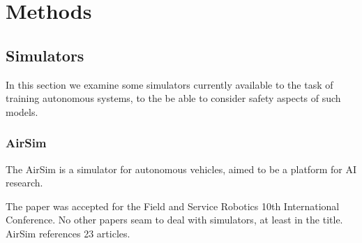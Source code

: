 

\chapter{Methods}
\label{Methods} 

\section{Simulators}

In this section we examine some simulators currently available to the task of training autonomous systems, to the be able to consider safety aspects of such models.

\subsection{AirSim}

The AirSim \cite{airsim2017fsr} is a simulator for autonomous vehicles, aimed to be a platform for AI research.

The paper was accepted for the Field and Service Robotics 10th International Conference. No other papers seam to deal with simulators, at least in the title. AirSim references 23 articles.